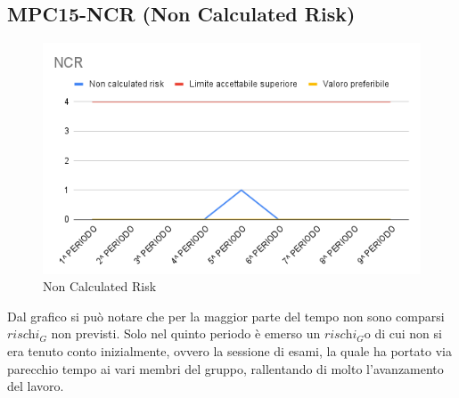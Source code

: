 \subsection{MPC15-NCR (Non Calculated Risk)}
\begin{figure}[H]
  \centering
  \includegraphics[width=0.7\linewidth]{grafici/NCR.png}
  \caption{Non Calculated Risk}
\end{figure}
Dal grafico si può notare che per la maggior parte del tempo non sono comparsi $\textit{rischi}_G$ non previsti. Solo nel quinto periodo è emerso un $\textit{rischi}_G$o di cui non si era tenuto conto inizialmente, ovvero la sessione di esami, la quale ha portato via parecchio tempo ai vari membri del gruppo, rallentando di molto l'avanzamento del lavoro.
